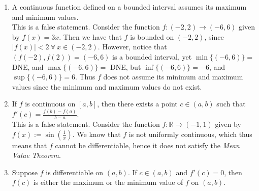 \documentclass[12pt,letterpaper]{article}
\newcommand{\R}{\mathbb{R}}
\theoremstyle{case}
\theoremstyle{definition}
\begin{document}
\begin{enumerate}
\begin{enumerate}
			\item A continuous function defined on a bounded interval assumes its maximum and minimum values.\\
			
			This is a false statement. Consider the function $f:(-2,2) \to (-6,6)$ given by $f(x)=3x$. Then we have that $f$ is bounded on $(-2,2)$, since $|f(x)|< 2\ \forall\ x \in (-2,2)$. However, notice that $(f(-2),f(2))=(-6,6)$ is a bounded interval, yet $\min\{(-6,6)\}=$ DNE, and $\max \{(-6,6)\}=$ DNE, but $\inf \{(-6,6)\}=-6$, and $\sup \{(-6,6)\}=6$. Thus $f$ does not assume its minimum and maximum values since the minimum and maximum values do not exist.\\
			
			\item If $f$ is continuous on $[a,b]$, then there exists a point $c \in (a,b)$ such that $f'(c)=\frac{f(b)-f(a)}{b-a}$.\\
			
			This is a false statement. Consider the function $f:\R \to (-1,1)$ given by $f(x):=\sin\left(\frac{1}{x}\right)$. We know that $f$ is not uniformly continuous, which thus means that $f$ cannot be differentiable, hence it does not satisfy the \textit{Mean Value Theorem}.\\
			
			\item Suppose $f$ is differentiable on $(a,b)$. If $c \in (a,b)$ and $f'(c)=0$, then $f(c)$ is either the maximum or the minimum value of $f$ on $(a,b)$.\\
			

\end{enumerate}
\end{enumerate}
\end{document}

